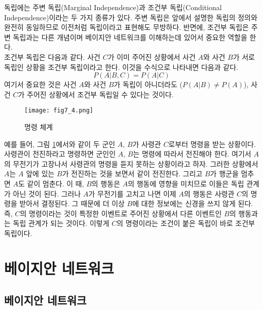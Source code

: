 \documentclass[a4paper]{oblivoir}
\begin{document}
독립에는 주변 독립(Marginal Independence)과 조건부 독립(Conditional Independence)이라는 두 가지 종류가 있다. 주변 독립은 앞에서 설명한 독립의 정의와 완전히 동일하므로 이전처럼 독립이라고 표현해도 무방하다. 반면에, 조건부 독립은 주변 독립과는 다른 개념이며 베이지안 네트워크를 이해하는데 있어서 중요한 역할을 한다. \\

조건부 독립은 다음과 같다. 사건 $C$가 이미 주어진 상황에서 사건 $A$와 사건 $B$가 서로 독립인 상황을 조건부 독립이라고 한다. 이것을 수식으로 나타내면 다음과 같다. 
\begin{equation}
P(A|B,C) = P(A|C)
\label{eq:7-13}
\end{equation}
여기서 중요한 것은 사건 $A$와 사건 $B$가 독립이 아니더라도 ($P(A|B) \neq P(A)$),  사건 $C$가 주어진 상황에서 조건부 독립일 수 있다는 것이다. \\

\begin{figure}[ht] \centering 
\texttt{[image: fig7\_4.png]} 
\caption{명령 체계}
\label{fig:7-4}
\end{figure} 

예를 들어, 그림 \ref{fig:7-4}에서와 같이 두 군인 $A$, $B$가 사령관 $C$로부터 명령을 받는 상황이다. 사령관이 전진하라고 명령하면 군인인 $A$, $B$는 명령에 따라서 전진해야 한다. 여기서 $A$의 무전기가 고장나서 사령관의 명령을 듣지 못하는 상황이라고 하자. 그러한 상황에서 $A$는 $A$ 앞에 있는 $B$가 전진하는 것을 보면서 같이 전진한다. 그리고 $B$가 행군을 멈추면 $A$도 같이 멈춘다. 이 때, $B$의 행동은 $A$의 행동에 영향을 미치므로 이들은 독립 관계가 아닌 것이 된다. 그러나 $A$가 무전기를 고치고 나면 이제 $A$의 행동은 사령관 $C$의 명령을 받아서 결정된다. 그 때문에 더 이상 $B$에 대한 정보에는 신경을 쓰지 않게 된다. 즉, $C$의 명령이라는 것이 특정한 이벤트로 주어진 상황에서 다른 이벤트인 $B$의 행동과는 독립 관계가 되는 것이다. 이렇게 $C$의 명령이라는 조건이 붙은 독립이 바로 조건부 독립이다. 

\section{베이지안 네트워크}

\subsection{베이지안 네트워크}
\end{document}
